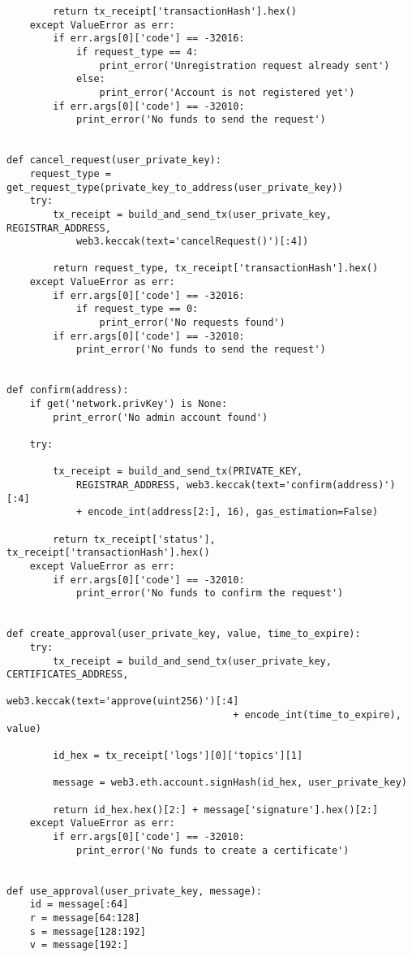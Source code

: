 \begin{verbatim}
        return tx_receipt['transactionHash'].hex()
    except ValueError as err:
        if err.args[0]['code'] == -32016:
            if request_type == 4:
                print_error('Unregistration request already sent')
            else:
                print_error('Account is not registered yet')
        if err.args[0]['code'] == -32010:
            print_error('No funds to send the request')


def cancel_request(user_private_key):
    request_type = get_request_type(private_key_to_address(user_private_key))
    try:
        tx_receipt = build_and_send_tx(user_private_key, REGISTRAR_ADDRESS, 
            web3.keccak(text='cancelRequest()')[:4])

        return request_type, tx_receipt['transactionHash'].hex()
    except ValueError as err:
        if err.args[0]['code'] == -32016:
            if request_type == 0:
                print_error('No requests found')
        if err.args[0]['code'] == -32010:
            print_error('No funds to send the request')


def confirm(address):
    if get('network.privKey') is None:
        print_error('No admin account found')

    try:

        tx_receipt = build_and_send_tx(PRIVATE_KEY,
            REGISTRAR_ADDRESS, web3.keccak(text='confirm(address)')[:4] 
            + encode_int(address[2:], 16), gas_estimation=False)

        return tx_receipt['status'], tx_receipt['transactionHash'].hex()
    except ValueError as err:
        if err.args[0]['code'] == -32010:
            print_error('No funds to confirm the request')


def create_approval(user_private_key, value, time_to_expire):
    try:
        tx_receipt = build_and_send_tx(user_private_key, CERTIFICATES_ADDRESS,
                                       web3.keccak(text='approve(uint256)')[:4] 
                                       + encode_int(time_to_expire), value)

        id_hex = tx_receipt['logs'][0]['topics'][1]

        message = web3.eth.account.signHash(id_hex, user_private_key)

        return id_hex.hex()[2:] + message['signature'].hex()[2:]
    except ValueError as err:
        if err.args[0]['code'] == -32010:
            print_error('No funds to create a certificate')


def use_approval(user_private_key, message):
    id = message[:64]
    r = message[64:128]
    s = message[128:192]
    v = message[192:]


\end{verbatim}
